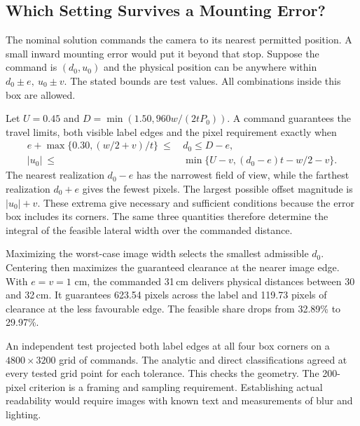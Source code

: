 \documentclass{swmcmthesis}
\begin{document}
\clearpage
\subsection{Which Setting Survives a Mounting Error?}
The nominal solution commands the camera to its nearest permitted position. A small inward mounting error would put it beyond that stop. Suppose the command is \((d_0,u_0)\) and the physical position can be anywhere within \(d_0\pm e,\ u_0\pm v\). The stated bounds are test values. All combinations inside this box are allowed.

Let \(U=0.45\) and \(D=\min(1.50,960w/(2tP_0))\). A command guarantees the travel limits, both visible label edges and the pixel requirement exactly when
\begin{align}
 e+\max\{0.30,(w/2+v)/t\}\ \leq &\,d_0\leq D-e,\\
 |u_0|\ \leq &\,\min\{U-v,(d_0-e)t-w/2-v\}.
\end{align}
The nearest realization \(d_0-e\) has the narrowest field of view, while the farthest realization \(d_0+e\) gives the fewest pixels. The largest possible offset magnitude is \(|u_0|+v\). These extrema give necessary and sufficient conditions because the error box includes its corners. The same three quantities therefore determine the integral of the feasible lateral width over the commanded distance.

\begin{table}[H]\centering
\caption{Guaranteed performance at the best centred command for equal axial and lateral tolerance. The share uses the original \(1.08\,\mathrm{m}^2\) command rectangle.}
\ToleranceTable
\end{table}
Maximizing the worst-case image width selects the smallest admissible \(d_0\). Centering then maximizes the guaranteed clearance at the nearer image edge. With \(e=v=1\) cm, the commanded 31\,cm delivers physical distances between 30 and 32\,cm. It guarantees 623.54 pixels across the label and 119.73 pixels of clearance at the less favourable edge. The feasible share drops from 32.89\% to 29.97\%.

An independent test projected both label edges at all four box corners on a \(4800\times3200\) grid of commands. The analytic and direct classifications agreed at every tested grid point for each tolerance. This checks the geometry. The 200-pixel criterion is a framing and sampling requirement. Establishing actual readability would require images with known text and measurements of blur and lighting.
\end{document}
